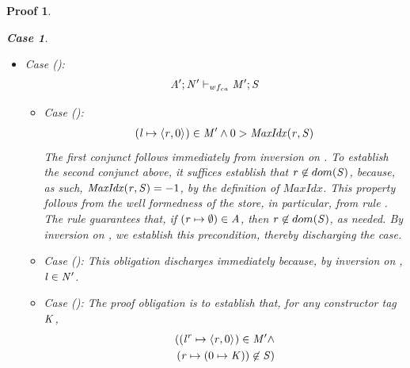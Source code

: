 \documentclass[showabstract,showacknowledgments,showpreface,showdedication]{iuphd}
\newtheorem*{bcase}{Case}
\theoremstyle{nonumberplain}
\newtheorem{nproof}{Proof}
\begin{document}
\begin{nproof}
\begin{bcase}
\begin{itemize}
\begin{itemize}
      given in the premise of the lemma is requirement
      .
      The specific requirement is to establish that
      \begin{align*}
      (\locreg{\loc}{\reg} \mapsto \concreteloc{\reg}{0}{}) \in \MENV',
      \end{align*}
      which follows immediately by inversion on \dletlocstart{}.
      \item Case ():
      \begin{align*}
      \mathit{A}';\mathit{N}' \vdash_{wf_{ca}} \mathit{M}';\mathit{S}
      \end{align*}
        \begin{itemize}
        \item Case ():
        \begin{align*}
                  (\mathit{l} \mapsto \langle \mathit{r}, 0 \rangle ^{}) \in \mathit{M}' \wedge
          0 > \mathit{MaxIdx}(\mathit{r},\mathit{S})
        \end{align*}
        The first conjunct follows immediately from inversion on \dletlocstart{}.
        To establish the second conjunct above, it suffices establish
        that $\mathit{r} \not \in dom(\mathit{S})$,
        because, as such, $\mathit{MaxIdx}(\mathit{r},\mathit{S}) = -1$, by the definition of $MaxIdx$.
        This property follows from the well formedness of the
        store, in particular, from rule
        .
        The rule guarantees that, if $(\mathit{r} \mapsto \emptyset) \in \mathit{A}$, then
        $\mathit{r} \not \in dom(\mathit{S})$, as needed.
        By inversion on \tllstart{}, we establish this precondition, thereby
        discharging the case.
        \item Case ():
        This obligation discharges immediately because, by inversion on \tllstart{}, $\mathit{l} \in \mathit{N}'$.
        \item Case ():
        The proof obligation is to establish that, for any constructor tag $\mathit{K}$,
        \begin{align*}
         (({\mathit{l}}^{\mathit{r}} \mapsto \langle \mathit{r}, 0 \rangle ^{}) \in \mathit{M}' \wedge \\
          (\mathit{r} \mapsto (0 \mapsto \mathit{K})) \not \in \mathit{S})
        \end{align*}

\end{itemize}
\end{itemize}
\end{itemize}
\end{bcase}
\end{nproof}
\end{document}
